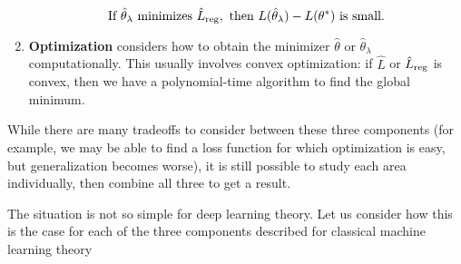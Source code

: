 \begin{enumerate}
\begin{equation}\label{lec9:eqn:classical-guarantee}
\text{If }\hat{\theta}_\lambda \text{ minimizes } \hat{L}_{\textup{reg}},\text{ then } L(\hat{\theta}_\lambda) - L(\theta^*) \text{ is small.}
\end{equation}

\item {\bf Optimization} considers how to obtain the minimizer $\hat\theta$ or $\hat{\theta}_\lambda$ computationally. This usually involves convex optimization: if $\hat{L}$ or $\hat{L}_{\textup{reg}}$ is convex, then we have a polynomial-time algorithm to find the global minimum.
\end{enumerate}

While there are many tradeoffs to consider between these three components (for example, we may be able to find a loss function for which optimization is easy, but generalization becomes worse), it is still possible to study each area individually, then combine all three to get a result.

The situation is not so simple for deep learning theory. Let us consider how this is the case for each of the three components described for classical machine learning theory

